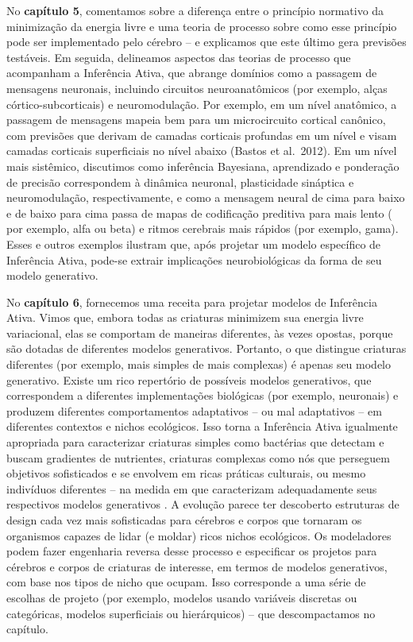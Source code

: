 \documentclass[
  12pt,
]{book}
\begin{document}
No \textbf{capítulo 5}, comentamos sobre a diferença entre o princípio normativo da minimização da energia livre e uma teoria de processo sobre como esse princípio pode ser implementado pelo cérebro -- e explicamos que este último gera previsões testáveis. Em seguida, delineamos aspectos das teorias de processo que acompanham a Inferência Ativa, que abrange domínios como a passagem de mensagens neuronais, incluindo circuitos neuroanatômicos (por exemplo, alças córtico-subcorticais) e neuromodulação. Por exemplo, em um nível anatômico, a passagem de mensagens mapeia bem para um microcircuito cortical canônico, com previsões que derivam de camadas corticais profundas em um nível e visam camadas corticais superficiais no nível abaixo (Bastos et al.~2012). Em um nível mais sistêmico, discutimos como inferência Bayesiana, aprendizado e ponderação de precisão correspondem à dinâmica neuronal, plasticidade sináptica e neuromodulação, respectivamente, e como a mensagem neural de cima para baixo e de baixo para cima passa de mapas de codificação preditiva para mais lento ( por exemplo, alfa ou beta) e ritmos cerebrais mais rápidos (por exemplo, gama). Esses e outros exemplos ilustram que, após projetar um modelo específico de Inferência Ativa, pode-se extrair implicações neurobiológicas da forma de seu modelo generativo.

No \textbf{capítulo 6}, fornecemos uma receita para projetar modelos de Inferência Ativa. Vimos que, embora todas as criaturas minimizem sua energia livre variacional, elas se comportam de maneiras diferentes, às vezes opostas, porque são dotadas de diferentes modelos generativos. Portanto, o que distingue criaturas diferentes (por exemplo, mais simples de mais complexas) é apenas seu modelo generativo. Existe um rico repertório de possíveis modelos generativos, que correspondem a diferentes implementações biológicas (por exemplo, neuronais) e produzem diferentes comportamentos adaptativos -- ou mal adaptativos -- em diferentes contextos e nichos ecológicos. Isso torna a Inferência Ativa igualmente apropriada para caracterizar criaturas simples como bactérias que detectam e buscam gradientes de nutrientes, criaturas complexas como nós que perseguem objetivos sofisticados e se envolvem em ricas práticas culturais, ou mesmo indivíduos diferentes -- na medida em que caracterizam adequadamente seus respectivos modelos generativos . A evolução parece ter descoberto estruturas de design cada vez mais sofisticadas para cérebros e corpos que tornaram os organismos capazes de lidar (e moldar) ricos nichos ecológicos. Os modeladores podem fazer engenharia reversa desse processo e especificar os projetos para cérebros e corpos de criaturas de interesse, em termos de modelos generativos, com base nos tipos de nicho que ocupam. Isso corresponde a uma série de escolhas de projeto (por exemplo, modelos usando variáveis \hspace{0pt}\hspace{0pt}discretas ou categóricas, modelos superficiais ou hierárquicos) -- que descompactamos no capítulo.
\end{document}
